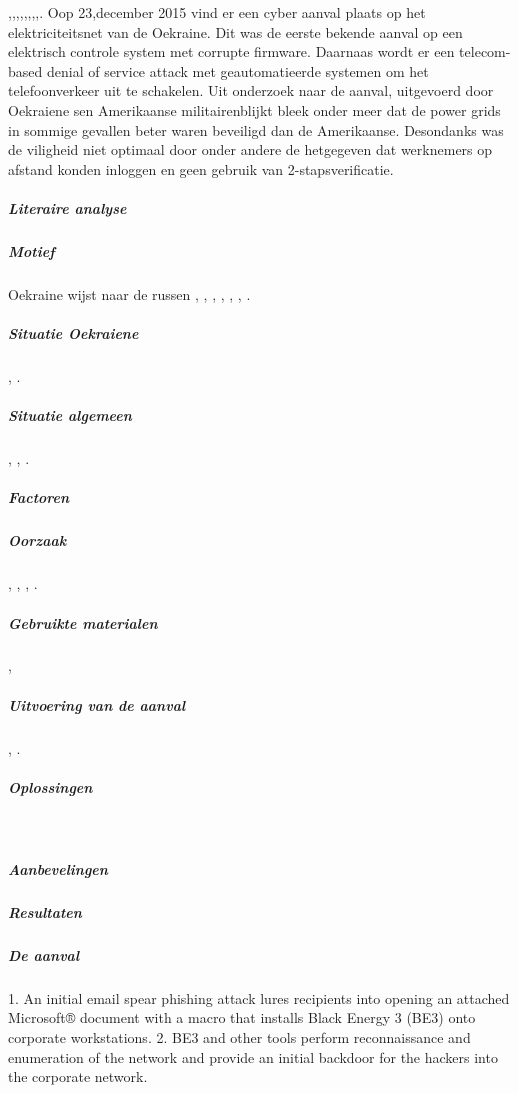 \cite{Whitehead2017ukrainepoweroutage},\cite{zetter2016GridHack},\cite{boozallen2016lightwentout},\cite{finklejan2016UsBlamesRussianSandworm},\cite{desarnaud2017cyberattacks},\cite{caseli04112016intrusiondetectioncontrolsystem},\cite{rochascadatesting},\cite{hidajat2016ScadaSimulator},\cite{zetter2017moreDangerousMalware}.
Oop 23,december 2015  vind er een cyber aanval plaats op het elektriciteitsnet van de Oekraine. Dit was de eerste bekende aanval op een elektrisch controle  system met corrupte firmware. Daarnaas wordt er een telecom-based denial of service attack met  geautomatieerde systemen om het telefoonverkeer uit te schakelen.
\cite{Whitehead2017ukrainepoweroutage}
Uit onderzoek\cite{zetter2016GridHack} naar de aanval,  uitgevoerd door Oekraiene sen Amerikaanse militairenblijkt  bleek onder meer dat de power grids in sommige gevallen beter waren beveiligd dan de Amerikaanse. Desondanks was de viligheid niet optimaal door onder andere de  hetgegeven dat werknemers op afstand konden inloggen en geen gebruik van 2-stapsverificatie.
\subparagraph{Literaire analyse}
\subparagraph{Motief}
Oekraine wijst naar de russen \cite{zetter2016GridHack}, 
\cite{greenberg2017Cyberwartestlab},
\cite{boozallen2016lightwentout},
\cite{finkle08012016russiansandwormhackers},
\cite{zinets15022017ukrainechargesrussia},
\cite{mcelfresh2016cyberattackhowandwhy},
\cite{parkwalstorm11102017russiagridattack}.
\subparagraph{Situatie Oekraiene}
\cite{drago2017CrashOverride},
\cite{slowik2019ReassasUkraine2016Attack}.
\subparagraph{Situatie algemeen}
\cite{cerulus2019FrontlineRussiaAttack},
\cite{desarnaud2017cyberattacks},
\cite{dragos2019TargetedTransStation}.
\subparagraph{Factoren}
\cite{shehod2016gridadvantageus}
\subparagraph{Oorzaak}
\cite{rocha2017cybersecyrityanalysisScada},
\cite{2017crashoverridenostuxnet},
\cite{vijayan2017firstmalwareCausedOutage},
\cite{slowik2019ReassasUkraine2016Attack}.
\subparagraph{Gebruikte materialen}
\cite{2015ukrainegridattack},
\cite{industroyershortfact}
\subparagraph{Uitvoering van de aanval}
\cite{Whitehead2017ukrainepoweroutage},
\cite{boozallen2016lightwentout}.
\subparagraph{Oplossingen}
~\cite{Whitehead2017ukrainepoweroutage}
\subparagraph{Aanbevelingen}
\subparagraph{Resultaten}
\subparagraph{De aanval}
1. An initial email spear phishing attack lures recipients
into opening an attached Microsoft® document with a
macro that installs Black Energy 3 (BE3) onto
corporate workstations.
2. BE3 and other tools perform reconnaissance and
enumeration of the network and provide an initial
backdoor for the hackers into the corporate network.
